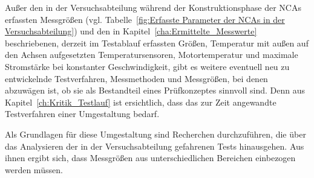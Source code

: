 Außer den in der Versuchsabteilung während der Konstruktionsphase der NCAs erfassten Messgrößen (vgl. Tabelle~\ref{fig:Erfasste Parameter der NCAs in der Versuchsabteilung}) und den in Kapitel~\ref{cha:Ermittelte_Messwerte} beschriebenen, derzeit im Testablauf erfassten Größen, Temperatur mit außen auf den Achsen aufgesetzten Temperatursensoren, Motortemperatur und maximale Stromstärke bei konstanter Geschwindigkeit, gibt es weitere eventuell neu zu entwickelnde Testverfahren, Messmethoden und Messgrößen, bei denen abzuwägen ist, ob sie als Bestandteil eines Prüfkonzeptes sinnvoll sind. Denn aus Kapitel~\ref{ch:Kritik_Testlauf} ist ersichtlich, dass das zur Zeit angewandte Testverfahren einer Umgestaltung bedarf.

Als Grundlagen für diese Umgestaltung sind Recherchen durchzuführen, die über das Analysieren der in der Versuchsabteilung gefahrenen Tests hinausgehen. Aus ihnen ergibt sich, dass Messgrößen aus unterschiedlichen Bereichen einbezogen werden müssen.


